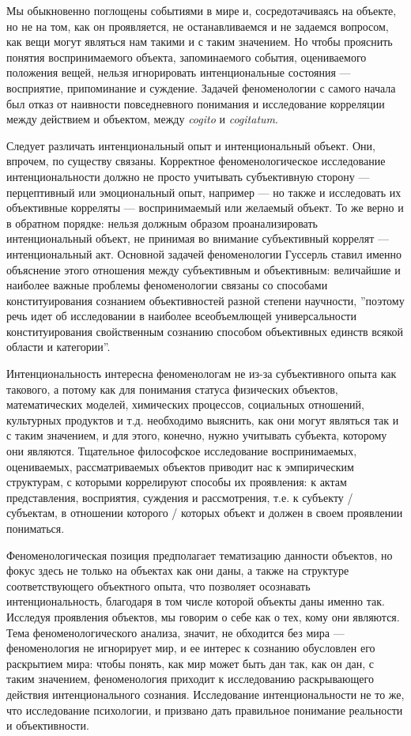 \documentclass[11pt]{book}
\begin{document}
Мы обыкновенно поглощены событиями в мире и, сосредотачиваясь на объекте, но не на том, как он проявляется, не останавливаемся и не задаемся вопросом, как вещи могут являться нам такими и с таким значением. Но чтобы прояснить понятия воспринимаемого объекта, запоминаемого события, оцениваемого положения вещей, нельзя игнорировать интенциональные состояния --- восприятие, припоминание и суждение. Задачей феноменологии с самого начала был отказ от наивности повседневного понимания и исследование корреляции между действием и объектом, между \textit{cogito} и \textit{cogitatum}.

Следует различать интенциональный опыт и интенциональный объект. Они, впрочем, по существу связаны. Корректное феноменологическое исследование интенциональности должно не просто учитывать субъективную сторону --- перцептивный или эмоциональный опыт, например --- но также и исследовать их объективные корреляты --- воспринимаемый или желаемый объект. То же верно и в обратном порядке: нельзя должным образом проанализировать интенциональный объект, не принимая во внимание субъективный коррелят --- интенциональный акт. Основной задачей феноменологии Гуссерль ставил именно объяснение этого отношения между субъективным и объективным: величайшие и наиболее важные проблемы феноменологии связаны со способами конституирования сознанием объективностей разной степени научности, ''поэтому речь идет об исследовании в наиболее всеобъемлющей универсальности конституирования свойственным сознанию способом объективных единств всякой области и категории''.

Интенциональность интересна феноменологам не из-за субъективного опыта как такового, а потому как для понимания статуса физических объектов, математических моделей, химических процессов, социальных отношений, культурных продуктов и т.д. необходимо выяснить, как они могут являться так и с таким значением, и для этого, конечно, нужно учитывать субъекта, которому они являются. Тщательное философское исследование воспринимаемых, оцениваемых, рассматриваемых объектов приводит нас к эмпирическим структурам, с которыми коррелируют способы их проявления: к актам представления, восприятия, суждения и рассмотрения, т.е. к субъекту / субъектам, в отношении которого / которых объект и должен в своем проявлении пониматься.

Феноменологическая позиция предполагает тематизацию данности объектов, но фокус здесь не только на объектах как они даны, а также на структуре соответствующего объектного опыта, что позволяет осознавать интенциональность, благодаря в том числе которой объекты даны именно так. Исследуя проявления объектов, мы говорим о себе как о тех, кому они являются. Тема феноменологического анализа, значит, не обходится без мира --- феноменология не игнорирует мир, и ее интерес к сознанию обусловлен его раскрытием мира: чтобы понять, как мир может быть дан так, как он дан, с таким значением, феноменология приходит к исследованию раскрывающего действия интенционального сознания. Исследование интенциональности не то же, что исследование психологии, и призвано дать правильное понимание реальности и объективности.
\end{document}
